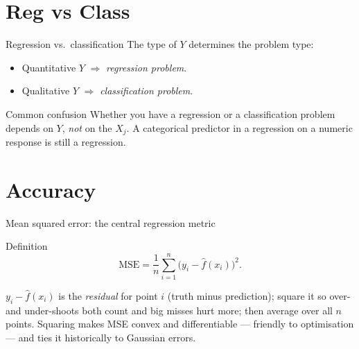 \documentclass[aspectratio=169,11pt]{beamer}
\begin{document}
\section{Reg vs Class}

\begin{frame}{Regression vs.\ classification}
  The type of $Y$ determines the problem type:
  \begin{readme}
    \begin{itemize}
      \item Quantitative $Y$ $\Rightarrow$ \emph{regression problem}.
      \item Qualitative $Y$ $\Rightarrow$ \emph{classification
            problem}.
    \end{itemize}
  \end{readme}
  \begin{alertblock}{Common confusion}
    Whether you have a regression or a classification problem depends
    on $Y$, \emph{not} on the $X_j$. A categorical predictor in a
    regression on a numeric response is still a regression.
  \end{alertblock}
\end{frame}


\section{Accuracy}

\begin{frame}{Mean squared error: the central regression metric}
  \begin{block}{Definition}
    \[
      \boxed{\;
        \mathrm{MSE} = \frac{1}{n}\sum_{i=1}^n
          \bigl(y_i - \hat f(x_i)\bigr)^2.
      \;}
    \]
  \end{block}
  \begin{readme}
    $y_i-\hat f(x_i)$ is the \emph{residual} for point $i$ (truth minus
    prediction); square it so over- and under-shoots both count and big
    misses hurt more; then average over all $n$ points. Squaring makes
    MSE convex and differentiable --- friendly to optimisation --- and
    ties it historically to Gaussian errors.
  \end{readme}
\end{frame}
\end{document}
